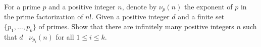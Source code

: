 For a prime $p$ and a positive integer $n$, denote by $\nu_p(n)$ the exponent of $p$ in the prime factorization of $n!$. Given a positive integer $d$ and a finite set $\{p_1, \ldots, p_k\}$ of primes. Show that there are infinitely many positive integers $n$ such that $d \mid \nu_{p_i}(n)$ for all $1 \leq i \leq k$.
